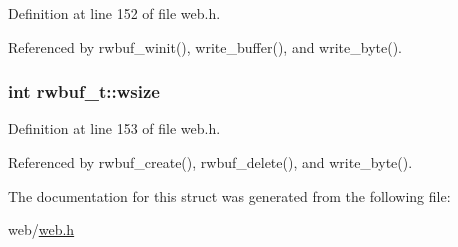 Definition at line 152 of file web.\+h.



Referenced by rwbuf\+\_\+winit(), write\+\_\+buffer(), and write\+\_\+byte().

\subsubsection[{\texorpdfstring{wsize}{wsize}}]{\setlength{\rightskip}{0pt plus 5cm}int rwbuf\+\_\+t\+::wsize}\hypertarget{structrwbuf__t_ac723cf150dd35d0f67ba7d38b18863ad}{}\label{structrwbuf__t_ac723cf150dd35d0f67ba7d38b18863ad}


Definition at line 153 of file web.\+h.



Referenced by rwbuf\+\_\+create(), rwbuf\+\_\+delete(), and write\+\_\+byte().



The documentation for this struct was generated from the following file\+:\begin{DoxyCompactItemize}
\item 
web/\hyperlink{web_8h}{web.\+h}\end{DoxyCompactItemize}
